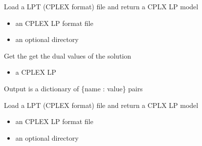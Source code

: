 \documentclass[letterpaper,10pt,english]{sphinxmanual}
\begin{document}
\begin{fulllineitems}
\label{\detokenize{modules_doc:cbmpy.CBCPLEX.cplx_getCPLEXModelFromLP}}
\pysigstartsignatures
{}
\pysigstopsignatures
\sphinxAtStartPar
Load a LPT (CPLEX format) file and return a CPLX LP model
\begin{itemize}
\item {} 
\sphinxAtStartPar
{} an CPLEX LP format file

\item {} 
\sphinxAtStartPar
{} an optional directory

\end{itemize}

\end{fulllineitems}


\begin{fulllineitems}
\label{\detokenize{modules_doc:cbmpy.CBCPLEX.cplx_getDualValues}}
\pysigstartsignatures
{}
\pysigstopsignatures
\sphinxAtStartPar
Get the get the dual values of the solution
\begin{itemize}
\item {} 
\sphinxAtStartPar
{} a CPLEX LP

\end{itemize}

\sphinxAtStartPar
Output is a dictionary of \{name : value\} pairs

\end{fulllineitems}


\begin{fulllineitems}
\label{\detokenize{modules_doc:cbmpy.CBCPLEX.cplx_getModelFromLP}}
\pysigstartsignatures
{}
\pysigstopsignatures
\sphinxAtStartPar
Load a LPT (CPLEX format) file and return a CPLX LP model
\begin{itemize}
\item {} 
\sphinxAtStartPar
{} an CPLEX LP format file

\item {} 
\sphinxAtStartPar
{} an optional directory

\end{itemize}

\end{fulllineitems}
\end{document}
